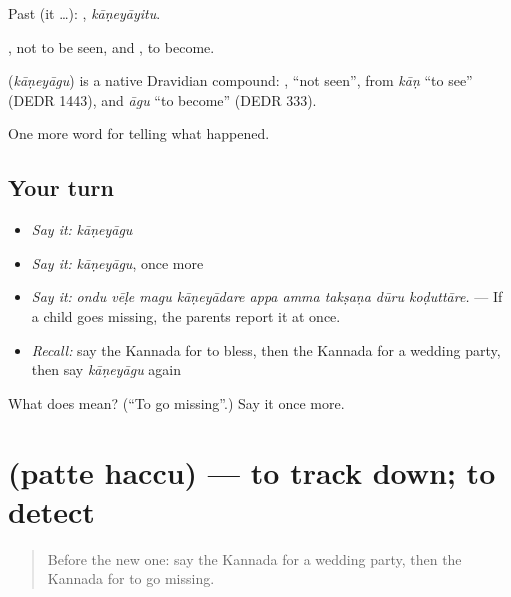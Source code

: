 Past (it …): , \emph{kāṇeyāyitu}.

, not to be seen, and , to become.

\begin{cousinweb}
\textbf{} (\emph{kāṇeyāgu}) is a native Dravidian compound: , \textquotedblleft{}not seen\textquotedblright{}, from \emph{kāṇ} \textquotedblleft{}to see\textquotedblright{} (DEDR 1443), and \emph{āgu} \textquotedblleft{}to become\textquotedblright{} (DEDR 333).
\end{cousinweb}

\begin{grammarlens}[title={What you've built}]
One more word for telling what happened.
\end{grammarlens}

\subsection*{Your turn}
\begin{itemize}
\raggedright
  \item \emph{Say it:} \emph{kāṇeyāgu}
  \item \emph{Say it:} \emph{kāṇeyāgu}, once more
  \item \emph{Say it:} \emph{ondu vēḷe magu kāṇeyādare appa amma takṣaṇa dūru koḍuttāre.} — If a child goes missing, the parents report it at once.
  \item \emph{Recall:} say the Kannada for to bless, then the Kannada for a wedding party, then say \emph{kāṇeyāgu} again
\end{itemize}

\begin{tcolorbox}[breakable,colback=teal!4,colframe=teal!35!black,title={Before you move on}]
What does  mean? (\textquotedblleft{}To go missing\textquotedblright{}.) Say it once more.
\end{tcolorbox}
\section[\texorpdfstring{\kn{ಪತ್ತೆ} \kn{ಹಚ್ಚು} (patte haccu)}{ಪತ್ತೆ ಹಚ್ಚು (patte haccu)}]{  (patte haccu) — to track down; to detect}

\label{lesson:KA-C326-patte-haccu}



\begin{quote}
Before the new one: say the Kannada for a wedding party, then the Kannada for to go missing.
\end{quote}

